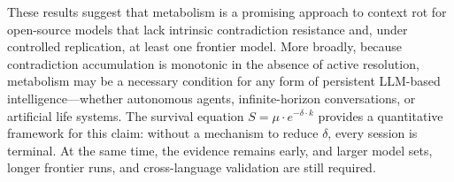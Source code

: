 \documentclass[11pt,a4paper]{article}
\begin{document}
These results suggest that metabolism is a promising approach to context rot for open-source models that lack intrinsic contradiction resistance and, under controlled replication, at least one frontier model.
More broadly, because contradiction accumulation is monotonic in the absence of active resolution, metabolism may be a necessary condition for any form of persistent LLM-based intelligence---whether autonomous agents, infinite-horizon conversations, or artificial life systems.
The survival equation $S = \mu \cdot e^{-\delta \cdot k}$ provides a quantitative framework for this claim: without a mechanism to reduce $\delta$, every session is terminal.
At the same time, the evidence remains early, and larger model sets, longer frontier runs, and cross-language validation are still required.


\end{document}
